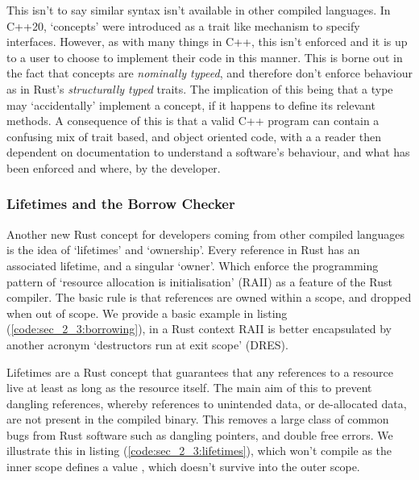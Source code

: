 
This isn't to say similar syntax isn't available in other compiled languages. In C++20, `concepts' were introduced as a trait like mechanism to specify interfaces. However, as with many things in C++, this isn't enforced and it is up to a user to choose to implement their code in this manner. This is borne out in the fact that concepts are \textit{nominally typeed}, and therefore don't enforce behaviour as in Rust's \textit{structurally typed} traits. The implication of this being that a type may `accidentally' implement a concept, if it happens to define its relevant methods. A consequence of this is that a valid C++ program can contain a confusing mix of trait based, and object oriented code, with a a reader then dependent on documentation to understand a software's behaviour, and what has been enforced and where, by the developer.

\subsubsection*{Lifetimes and the Borrow Checker}

Another new Rust concept for developers coming from other compiled languages is the idea of `lifetimes' and `ownership'. Every reference in Rust has an associated lifetime, and a singular `owner'. Which enforce the programming pattern of `resource allocation is initialisation' (RAII) as a feature of the Rust compiler. The basic rule is that references are owned within a scope, and dropped when out of scope. We provide a basic example in listing (\ref{code:sec_2_3:borrowing}), in a Rust context RAII is better encapsulated by another acronym `destructors run at exit scope' (DRES). 


Lifetimes are a Rust concept that guarantees that any references to a resource live at least as long as the resource itself. The main aim of this to prevent dangling references, whereby references to unintended data, or de-allocated data, are not present in the compiled binary. This removes a large class of common bugs from Rust software such as dangling pointers, and double free errors. We illustrate this in listing (\ref{code:sec_2_3:lifetimes}), which won't compile as the inner scope defines a value , which doesn't survive into the outer scope. 

